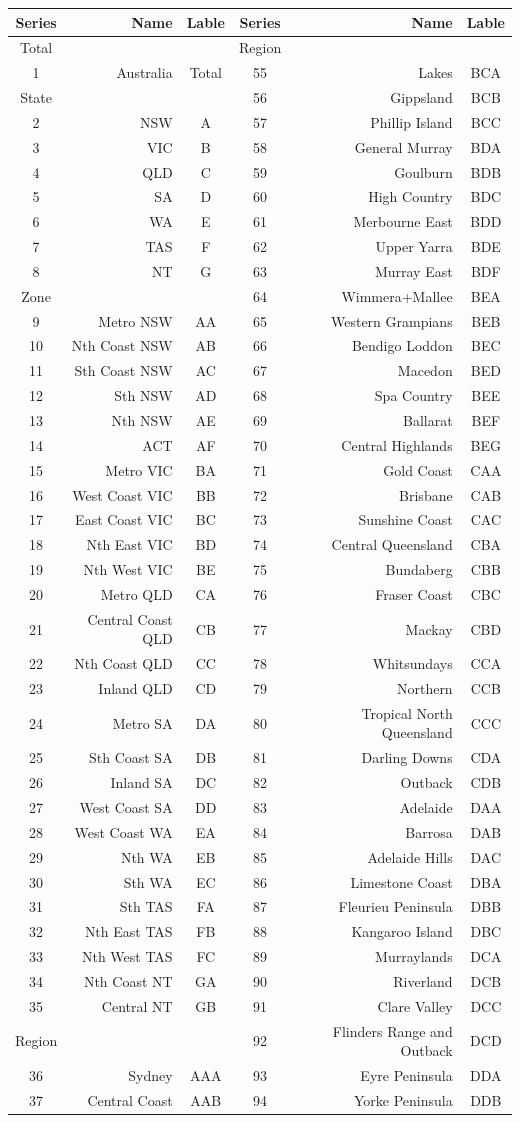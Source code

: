 \documentclass[11pt,a4paper,]{article}
\theoremstyle{definition}
\theoremstyle{definition}
\theoremstyle{definition}
\theoremstyle{remark}
\begin{document}
\begin{longtable}[]{@{}crccrc@{}}
\toprule
Series & Name & Lable & Series & Name & Lable\tabularnewline
\midrule
\endhead
Total & & & Region & &\tabularnewline
1 & Australia & Total & 55 & Lakes & BCA\tabularnewline
State & & & 56 & Gippsland & BCB\tabularnewline
2 & NSW & A & 57 & Phillip Island & BCC\tabularnewline
3 & VIC & B & 58 & General Murray & BDA\tabularnewline
4 & QLD & C & 59 & Goulburn & BDB\tabularnewline
5 & SA & D & 60 & High Country & BDC\tabularnewline
6 & WA & E & 61 & Merbourne East & BDD\tabularnewline
7 & TAS & F & 62 & Upper Yarra & BDE\tabularnewline
8 & NT & G & 63 & Murray East & BDF\tabularnewline
Zone & & & 64 & Wimmera+Mallee & BEA\tabularnewline
9 & Metro NSW & AA & 65 & Western Grampians & BEB\tabularnewline
10 & Nth Coast NSW & AB & 66 & Bendigo Loddon & BEC\tabularnewline
11 & Sth Coast NSW & AC & 67 & Macedon & BED\tabularnewline
12 & Sth NSW & AD & 68 & Spa Country & BEE\tabularnewline
13 & Nth NSW & AE & 69 & Ballarat & BEF\tabularnewline
14 & ACT & AF & 70 & Central Highlands & BEG\tabularnewline
15 & Metro VIC & BA & 71 & Gold Coast & CAA\tabularnewline
16 & West Coast VIC & BB & 72 & Brisbane & CAB\tabularnewline
17 & East Coast VIC & BC & 73 & Sunshine Coast & CAC\tabularnewline
18 & Nth East VIC & BD & 74 & Central Queensland & CBA\tabularnewline
19 & Nth West VIC & BE & 75 & Bundaberg & CBB\tabularnewline
20 & Metro QLD & CA & 76 & Fraser Coast & CBC\tabularnewline
21 & Central Coast QLD & CB & 77 & Mackay & CBD\tabularnewline
22 & Nth Coast QLD & CC & 78 & Whitsundays & CCA\tabularnewline
23 & Inland QLD & CD & 79 & Northern & CCB\tabularnewline
24 & Metro SA & DA & 80 & Tropical North Queensland & CCC\tabularnewline
25 & Sth Coast SA & DB & 81 & Darling Downs & CDA\tabularnewline
26 & Inland SA & DC & 82 & Outback & CDB\tabularnewline
27 & West Coast SA & DD & 83 & Adelaide & DAA\tabularnewline
28 & West Coast WA & EA & 84 & Barrosa & DAB\tabularnewline
29 & Nth WA & EB & 85 & Adelaide Hills & DAC\tabularnewline
30 & Sth WA & EC & 86 & Limestone Coast & DBA\tabularnewline
31 & Sth TAS & FA & 87 & Fleurieu Peninsula & DBB\tabularnewline
32 & Nth East TAS & FB & 88 & Kangaroo Island & DBC\tabularnewline
33 & Nth West TAS & FC & 89 & Murraylands & DCA\tabularnewline
34 & Nth Coast NT & GA & 90 & Riverland & DCB\tabularnewline
35 & Central NT & GB & 91 & Clare Valley & DCC\tabularnewline
Region & & & 92 & Flinders Range and Outback & DCD\tabularnewline
36 & Sydney & AAA & 93 & Eyre Peninsula & DDA\tabularnewline
37 & Central Coast & AAB & 94 & Yorke Peninsula & DDB\tabularnewline

\end{longtable}
\end{document}
